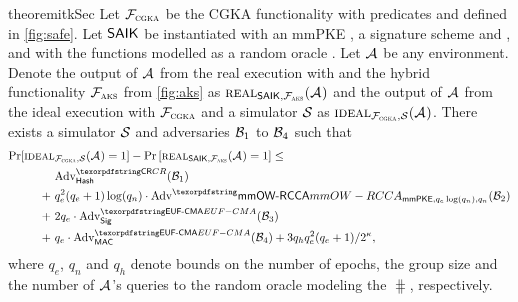 \newcommand{\ucideal}{\textnormal{\textsc{ideal}}}
\newcommand{\ucreal}{\textnormal{\textsc{real}}}
\begin{restatable}{theorem}{itkSec}\label{thm:saik-security}
	Let $\funcCGKA$ be the CGKA functionality with predicates \KwConf{} and \KwAuth{} defined in \cref{fig:safe}. Let $\saik$ be instantiated with an mmPKE \mmPKE, a signature scheme \sigscheme and \mac, and with the \hkdf functions modelled as a random oracle \hash.
	Let $\Adv$ be any environment. Denote the output of $\Adv$ from the real execution with \saik and the hybrid functionality $\funcPKI$ from \cref{fig:aks} as $\ucreal_{\saik, \funcPKI}(\Adv)$ and the output of $\Adv$ from the ideal execution with $\funcCGKA$ and a simulator $\ucsim$ as $\ucideal_{\funcCGKA, \ucsim}(\Adv)$.
	There exists a simulator $\ucsim$ and adversaries $\Bdv[1]$ to $\Bdv[4]$ such that
	\begin{align*}
		\Pr[\ucideal&_{\funcCGKA, \ucsim}(\Adv) = 1] - \Pr\left[\ucreal_{\saik, \funcPKI}(\Adv) = 1\right] \leq\\
		&\textnormal{Adv}^{\gamefont{CR}}_{\hash}(\Bdv[1]) \\
	+\ & q_e^2(q_e+1) \log(q_n) \cdot\textnormal{Adv}^\mmowrcca_{\mmPKE,q_e\log(q_n),q_n}(\Bdv[2]) \\
	+\ & 2q_e\cdot \textnormal{Adv}^{\ufcma}_\sigscheme(\Bdv[3]) \\
	+\ & q_e \cdot \textnormal{Adv}^{\ufcma}_\mac(\Bdv[4]) + 3q_hq_e^2(q_e+1)/2^\kappa,
\end{align*}
	where $q_e$, $q_n$ and $q_h$ denote bounds on the number of epochs, the group size and the number of $\Adv$'s queries to the random oracle modeling the $\hash$, respectively.

  \end{restatable}

